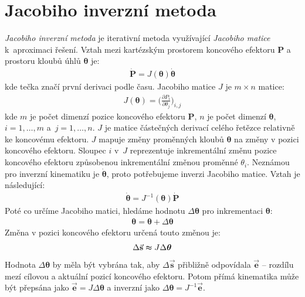 \section{Jacobiho inverzní metoda}
\textit{Jacobiho inverzní metoda} \cite{Buss09introductionto, welman, AristidouTR632} je iterativní metoda využívající \textit{Jacobiho matice} k~aproximaci řešení. Vztah mezi kartézským prostorem koncového efektoru $\mathbf{P}$ a prostoru kloubů úhlů $\boldsymbol{\theta}$ je:
\begin{eqnarray}
\mathbf{\dot{P}} = J(\boldsymbol{\theta})\boldsymbol{\dot{\theta}}\label{r.jacobian_vztah}
\end{eqnarray}
kde tečka značí první derivaci podle času. Jacobiho matice $J$ je $m \times n$ matice:
\begin{eqnarray}
J(\boldsymbol{\theta}) = \bigg(\frac{\partial P_i}{\partial \theta_j}\bigg)_{i,j}\label{r.jacobian_matrix}
\end{eqnarray}
kde $m$ je počet dimenzí pozice koncového efektoru $\mathbf{P}$, $n$ je počet dimenzí $\boldsymbol{\theta}$, $i = 1,\dots,m$ a~$j = 1,\dots,n$. $J$ je matice částečných derivací celého řetězce relativně ke koncovému efektoru. $J$ mapuje změny proměnných kloubů $\boldsymbol{\theta}$ na změny v pozici koncového efektoru. Sloupec $i$ v~$J$ reprezentuje inkrementální změnu pozice koncového efektoru způsobenou inkrementální změnou proměnné $\theta_i$. 
Neznámou pro inverzní kinematiku je $\boldsymbol{\dot{\theta}}$, proto potřebujeme inverzi Jacobiho matice. Vztah je následující:
\begin{eqnarray}
\boldsymbol{\dot{\theta}} = J^{-1}(\boldsymbol{\theta})\mathbf{\dot{P}}\label{r.jacobian_vztah_inverse}
\end{eqnarray}
Poté co určíme Jacobiho matici, hledáme hodnotu $\Delta\boldsymbol{\theta}$ pro inkrementaci $\boldsymbol{\theta}$:
\begin{eqnarray}
\boldsymbol{\theta} = \boldsymbol{\theta} + \Delta\boldsymbol{\theta}\label{r.jacobian_increment}
\end{eqnarray}
Změna v pozici koncového efektoru určená touto změnou je:
\begin{eqnarray}
\Delta\vec{\mathbf{s}} \thickapprox J\Delta\boldsymbol{\theta}\label{r.jacobian_change}
\end{eqnarray}
Hodnota $\Delta\boldsymbol{\theta}$ by měla být vybrána tak, aby $\Delta\vec{\mathbf{s}}$ přibližně odpovídala $\vec{\mathbf{e}}$ -- rozdílu mezí cílovou a aktuální pozicí koncového efektoru. Potom přímá kinematika může být přepsána jako $\vec{\mathbf{e}} = J\Delta\boldsymbol{\theta}$ a inverzní jako $\Delta\boldsymbol{\theta} = J^{-1}\vec{\mathbf{e}}$.

